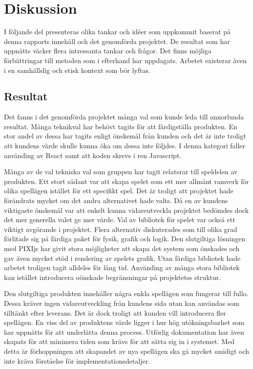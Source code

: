 \chapter{Diskussion}
\label{cha:discussion}

I följande del presenteras olika tankar och idéer som uppkommit baserat på denna rapports innehåll och det genomförda projektet. De resultat som har uppnåtts väcker flera intressanta tankar och frågor. Det finns möjliga förbättringar till metoden som i efterhand har uppdagats. Arbetet existerar även i en samhällslig och etisk kontext som bör lyftas.

\section{Resultat}
\label{sec:discussion-results}

Det fanns i det genomförda projektet många val som kunde leda till annorlunda resultat. Många teknikval har behövt tagits för att färdigställa produkten. En stor andel av dessa har tagits enligt önskemål från kunden och det är inte troligt att kundens värde skulle kunna öka om dessa inte följdes. I denna kategori faller använding av React samt att koden skrevs i ren Javascript.

Många av de val tekniska val som gruppen har tagit relaterar till speldelen av produkten. Ett stort sådant var att skapa spelet som ett mer allmänt ramverk för olika spellägen istället för ett specifikt spel. Det är troligt att projektet hade förändrats mycket om det andra alternativet hade valts. Då en av kundens viktigaste önskemål var att enkelt kunna vidareutveckla projektet bedömdes dock det mer generella valet ge mer värde. Val av bibliotek för spelet var också ett viktigt avgörande i projektet. Flera alternativ diskuterades som till olika grad förlitade sig på färdiga paket för fysik, grafik och logik. Den slutgiltiga lösningen med PIXIjs har givit stora möjligheter att skapa det system som önskades och gav även mycket stöd i rendering av spelets grafik. Utan färdiga bibliotek hade arbetet troligen tagit alldeles för lång tid. Använding av många stora bibliotek kan istället introducera oönskade begränsningar på projektetss struktur.

Den slutgiltiga produkten innehåller några enkla spellägen som fungerar till fullo. Dessa kräver ingen vidareutveckling från kundens sida utan kan användas som tilltänkt efter leverans. Det är dock troligt att kunden vill introducera fler spellägen. En viss del av produktens värde ligger i hur hög utökningsbarhet som har uppnåtts för att underlätta denna process. Utförlig dokumentation har även skapats för att minimera tiden som krävs för att sätta sig in i systemet. Med detta är förhoppningen att skapandet av nya spellägen ska gå mycket smidigt och inte kräva förståelse för implementationsdetaljer.

